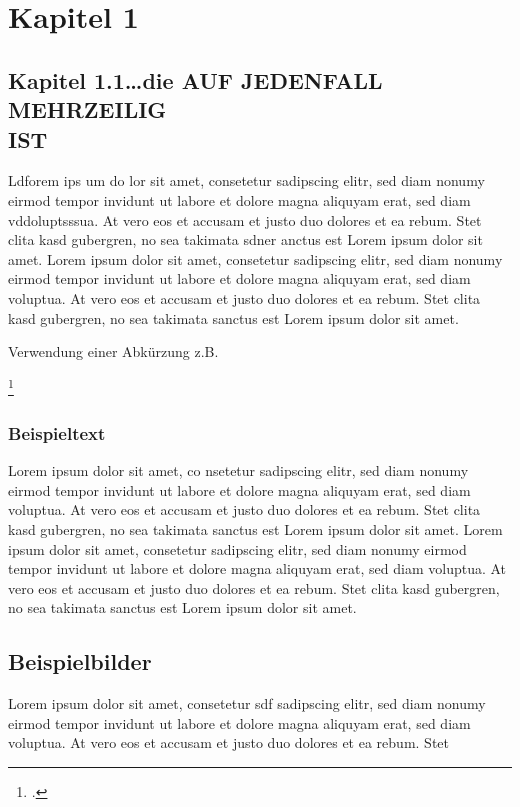 \section{Kapitel 1}

\subsection{Kapitel 1.1\ldots die AUF JEDENFALL MEHRZEILIG\\IST}

Ldforem ips um do lor sit amet, consetetur sadipscing elitr, \label{Referenz}
sed diam  nonumy eirmod tempor invidunt ut labore et dolore magna aliquyam erat,
sed diam vddoluptsssua. At vero eos et accusam et justo duo dolores et ea rebum.
Stet clita kasd gubergren, no sea takimata sdner anctus est Lorem ipsum dolor sit amet. Lorem ipsum dolor sit amet, consetetur sadipscing elitr, sed diam nonumy eirmod tempor invidunt ut labore et dolore magna aliquyam erat, sed diam voluptua. At vero eos et accusam et justo duo dolores et ea rebum. Stet clita kasd gubergren, no sea takimata sanctus est Lorem ipsum dolor sit amet.

Verwendung einer Abkürzung \ac{z.B.}

\footcite[Vgl.][Experto.de, Artikel über das und jenes]{praxishandbuch:bpmn2}
\subsubsection{Beispieltext}
Lorem ipsum dolor sit amet, co nsetetur sadipscing elitr, sed diam
nonumy eirmod tempor invidunt ut labore et dolore magna aliquyam erat, sed diam voluptua. At vero eos et accusam et justo duo dolores et ea rebum. Stet clita kasd gubergren, no sea takimata sanctus est Lorem ipsum dolor sit amet. Lorem ipsum dolor sit amet, consetetur sadipscing elitr, sed diam nonumy eirmod tempor invidunt ut labore et dolore magna aliquyam erat, sed diam voluptua. At vero eos et accusam et justo duo dolores et ea rebum. Stet clita kasd gubergren, no sea takimata sanctus est Lorem ipsum dolor sit amet.

\clearpage

\subsection{Beispielbilder}
Lorem ipsum dolor sit amet, consetetur  sdf sadipscing elitr, sed diam nonumy eirmod tempor invidunt ut labore et dolore magna aliquyam erat, sed diam voluptua. At vero eos et accusam et justo duo dolores et ea rebum. Stet

